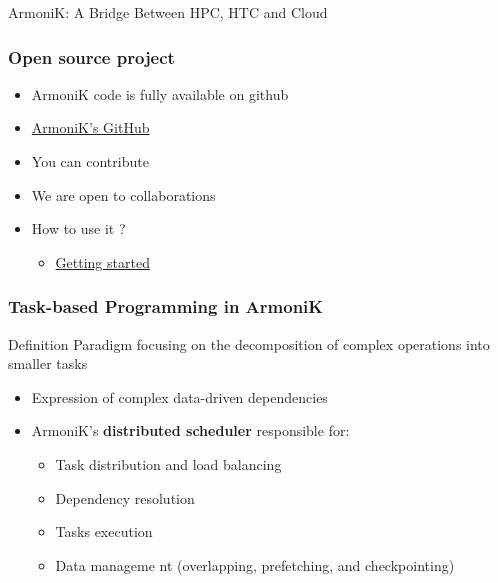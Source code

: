 \documentclass[10pt,aspectratio=1609]{beamer}
\begin{document}
\begin{section}{ArmoniK: A Bridge Between HPC, HTC and Cloud}
  \begin{frame}
    \frametitle{Open source project}
    \begin{itemize}
      \item ArmoniK code is fully available on github
      \item \href{https://github.com/aneoconsulting/ArmoniK}{ArmoniK's GitHub}
      \item You can contribute
      \item We are open to collaborations
      \item How to use it ?
      \begin{itemize}
        \item \href{https://armonik.readthedocs.io/en/latest/content/armonik/getting-started.html}{Getting started}
      \end{itemize}
    \end{itemize}
  \end{frame}

  \begin{frame}
    \frametitle{Task-based Programming in ArmoniK}
    \begin{block}{Definition}
      Paradigm focusing on the decomposition of complex operations into smaller tasks
    \end{block}
    \begin{itemize}
      \item Expression of complex data-driven dependencies
      \item ArmoniK's \textbf{distributed scheduler} responsible for:
      \begin{itemize}
        \item Task distribution and load balancing
        \item Dependency resolution
        \item Tasks execution
        \item Data manageme nt (overlapping, prefetching, and checkpointing)
      \end{itemize}
    \end{itemize}
  \end{frame}


\end{section}
\end{document}
